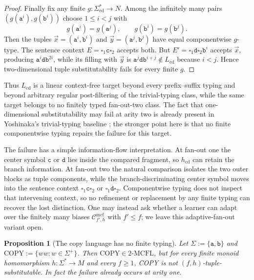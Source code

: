 \documentclass[11pt]{article}
\numberwithin{equation}{section}
\theoremstyle{plain}
\newtheorem{proposition}[theorem]{Proposition}
\theoremstyle{definition}
\theoremstyle{remark}
\newcommand{\Cmcf}[2]{\mathcal{C}^{\mathrm{mcf}}_{#1,#2}}
\newcommand{\tuple}[1]{\vec{#1}}
\newcommand{\blank}{\square}
\begin{document}
\begin{proof}
Finally fix any finite $g:\Sigma_{\mathrm{cd}}^*\to N$.  Among the infinitely many
pairs $(g(\mathtt a^i),g(\mathtt b^i))$ choose $1\le i<j$ with
\[
  g(\mathtt a^i)=g(\mathtt a^j),
  \qquad
  g(\mathtt b^i)=g(\mathtt b^j).
\]
Then the tuples
$\tuple x=(\mathtt a^i,\mathtt b^i)$ and
$\tuple y=(\mathtt a^j,\mathtt b^j)$ have equal componentwise $g$-type.  The
sentence context $E=\blank_1\mathtt c\blank_2$ accepts both.  But
$E'=\blank_1\mathtt d\blank_2\mathtt b^i$ accepts $\tuple x$, producing
$\mathtt a^i\mathtt d\mathtt b^{2i}$, while its filling with $\tuple y$ is
$\mathtt a^j\mathtt d\mathtt b^{i+j}\notin L_{\mathrm{cd}}$ because $i<j$.
Hence two-dimensional tuple substitutability fails for every finite $g$.
\end{proof}

Thus $L_{\mathrm{cd}}$ is a linear context-free target beyond every
prefix--suffix typing and beyond arbitrary regular post-filtering of the
trivial-typing class, while the same target belongs to no finitely typed
fan-out-two class.  The fact that one-dimensional substitutability may fail at
arity two is already present in Yoshinaka's trivial-typing baseline
\cite[Example~5]{Yoshinaka2011}; the stronger point here is that no finite
componentwise typing repairs the failure for this target.

The failure has a simple information-flow interpretation.  At fan-out one the
center symbol $\mathtt c$ or $\mathtt d$ lies inside the compared fragment, so
$h_{\mathrm{cd}}$ can retain the branch information.  At fan-out two the natural
comparison isolates the two outer blocks as tuple components, while the
branch-discriminating center symbol moves into the sentence context
$\blank_1\mathtt c\blank_2$ or $\blank_1\mathtt d\blank_2$.  Componentwise
typing does not inspect that intervening context, so no refinement or
replacement by any finite typing can recover the lost distinction.  One may
instead ask whether a learner can adapt over the finitely many biases
$\Cmcf{f'}{h}$ with $f'\le f$; we leave this adaptive-fan-out variant open.

\begin{proposition}[The copy language has no finite typing]
\label{prop:copy-infinite-typing}
Let $\Sigma:=\{\mathtt a,\mathtt b\}$ and
$\mathrm{COPY}:=\{ww:w\in\Sigma^+\}$.  Then
$\mathrm{COPY}\in2\text{-}\mathrm{MCFL}$, but for every finite monoid
homomorphism $h:\Sigma^*\to M$ and every $f\ge1$, COPY is not
$(f,h)$-tuple-substitutable.  In fact the failure already occurs at arity one.
\end{proposition}
\end{document}
